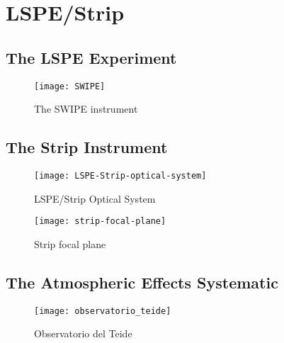 \chapter{LSPE/Strip}

\section{The LSPE Experiment}

\begin{figure}
        \centering
        \texttt{[image: SWIPE]}
        \caption{The SWIPE instrument}
        \label{fig:swipe}
\end{figure}

\section{The Strip Instrument}

\begin{figure}
        \centering
        \texttt{[image: LSPE-Strip-optical-system]}
        \caption{LSPE/Strip Optical System}
        \label{fig:lspe-strip_optical_system}
\end{figure}

\begin{figure}
        \centering
        \texttt{[image: strip-focal-plane]}
        \caption{Strip focal plane}
        \label{fig:strip_focal_plane}
\end{figure}

\section{The Atmospheric Effects Systematic}

\begin{figure}
        \centering
        \texttt{[image: observatorio\_teide]}
        \caption{Observatorio del Teide}
        \label{fig:observatorio_teide}
\end{figure}

